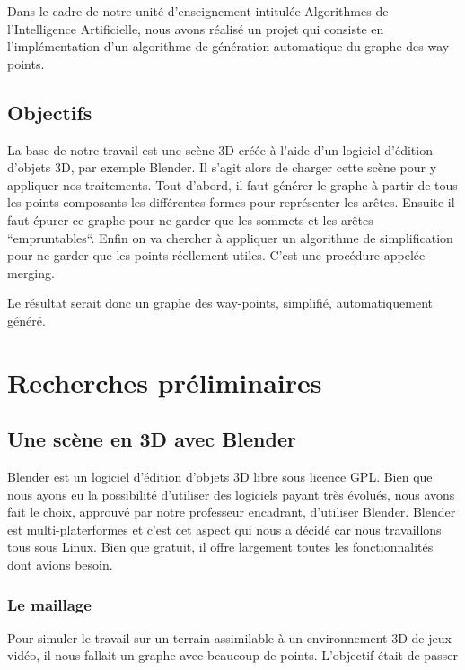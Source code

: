 \documentclass[a4paper,12pt]{report}
\begin{document}
Dans le cadre de notre unité d'enseignement intitulée Algorithmes de l'Intelligence Artificielle, nous avons réalisé un projet qui consiste en l'implémentation d'un algorithme de génération automatique du graphe des way-points.


\section*{Objectifs}

La base de notre travail est une scène 3D créée à l'aide d'un logiciel d'édition d'objets 3D, par exemple Blender. Il s'agit alors de charger cette scène pour y appliquer nos traitements. Tout d'abord, il faut générer le graphe à partir de tous les points composants les différentes formes pour représenter les arêtes. Ensuite il faut épurer ce graphe pour ne garder que les sommets et les arêtes ``empruntables``. Enfin on va chercher à appliquer un algorithme de simplification pour ne garder que les points réellement utiles. C'est une procédure appelée merging.

Le résultat serait donc un graphe des way-points, simplifié, automatiquement généré.

\chapter{Recherches préliminaires}

\section{Une scène en 3D avec Blender}

Blender est un logiciel d'édition d'objets 3D libre sous licence GPL. Bien que nous ayons eu la possibilité d'utiliser des logiciels payant très évolués, nous avons fait le choix, approuvé par notre professeur encadrant, d'utiliser Blender. Blender est multi-platerformes et c'est cet aspect qui nous a décidé car nous travaillons tous sous Linux. Bien que gratuit, il offre largement toutes les fonctionnalités dont avions besoin.

\subsection{Le maillage}

Pour simuler le travail sur un terrain assimilable à un environnement 3D de jeux vidéo, il nous fallait un graphe avec beaucoup de points. L'objectif était de passer 
\end{document}
